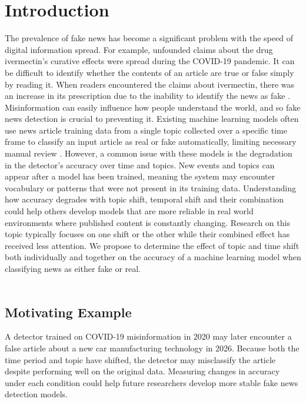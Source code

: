 \documentclass[sigconf]{acmart}
\begin{document}
\section{Introduction}
The prevalence of fake news has become a significant problem with the speed of digital information spread. For example, unfounded claims about the drug ivermectin’s curative effects were spread during the COVID-19 pandemic. It can be difficult to identify whether the contents of an article are true or false simply by reading it. When readers encountered the claims about ivermectin, there was an increase in its prescription due to the inability to identify the news as fake \cite{ivermectin}. Misinformation can easily influence how people understand the world, and so fake news detection is crucial to preventing it. Existing machine learning models often use news article training data from a single topic collected over a specific time frame to classify an input article as real or fake automatically, limiting necessary manual review \cite{fakeNews}. However, a common issue with these models is the degradation in the detector’s accuracy over time and topics. New events and topics can appear after a model has been trained, meaning the system may encounter vocabulary or patterns that were not present in its training data. Understanding how accuracy degrades with topic shift, temporal shift and their combination could help others develop models that are more reliable in real world environments where published content is constantly changing. Research on this topic typically focuses on one shift or the other while their combined effect has received less attention. We propose to determine the effect of topic and time shift both individually and together on the accuracy of a machine learning model when classifying news as either fake or real.
\\\\
\vspace{-0.9cm}
\subsection{Motivating Example}
A detector trained on COVID-19 misinformation in 2020 may later
encounter a false article about a new car manufacturing technology in 2026. Because both the time period and topic have shifted, the detector may misclassify the article despite performing well on the original data. Measuring changes in accuracy under each condition could help future researchers develop more stable fake news detection models.
\end{document}

